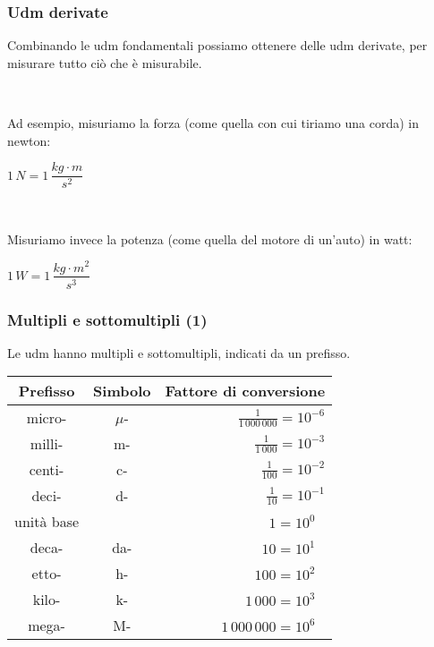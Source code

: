 \documentclass[]{beamer}
\begin{document}
\begin{frame}
\frametitle{Udm derivate}
\alert<1>{Combinando le udm fondamentali possiamo ottenere delle udm derivate}, per misurare tutto ciò che è misurabile.\pause

~

Ad esempio, \alert<2>{misuriamo la forza} (come quella con cui tiriamo una corda) \alert<2>{in newton}:
\begin{center}
$ 1 \, N = 1 \, \dfrac{kg \cdot m}{s^2} $
\end{center}\pause

~

Misuriamo invece \alert<3>{la potenza} (come quella del motore di un'auto) \alert<3>{in watt}:
\begin{center}
$ 1 \, W = 1 \, \dfrac{kg \cdot m^2}{s^3} $
\end{center}
\end{frame}



\begin{frame}
\frametitle{Multipli e sottomultipli (1)}
Le udm hanno multipli e sottomultipli, indicati da un prefisso.

\begin{table}[htp]\centering
\begin{tabular}{c|c|r}
      \textbf{Prefisso} & \textbf{Simbolo} & \textbf{Fattore di conversione}\\\hline\rule{0pt}{3ex}
      micro- & $ \mu $- & $ \frac{1}{1\,000\,000} = 10^{-6} $\\\rule{0pt}{3ex}
      milli- & m- & $ \frac{1}{1\,000} = 10^{-3} $\\\rule{0pt}{3ex}
      centi- & c- & $ \frac{1}{100} =10^{-2} $\\\rule{0pt}{3ex}
      deci- & d- & $ \frac{1}{10} =10^{-1} $\\\rule{0pt}{3ex}
      unità base & & $ 1 = 10^{0}\,\,\,\,  $ \\\rule{0pt}{3ex}
      deca- & da- & $ 10 = 10^{1}\,\,\,\, $\\\rule{0pt}{3ex}
      etto- & h- & $ 100 = 10^{2}\,\,\,\, $\\\rule{0pt}{3ex}
      kilo- & k- & $ 1\,000 = 10^{3}\,\,\,\, $\\\rule{0pt}{3ex}
      mega- & M- & $ 1\,000\,000 = 10^{6}\,\,\,\, $\\
\end{tabular}
\end{table}
\end{frame}
\end{document}
